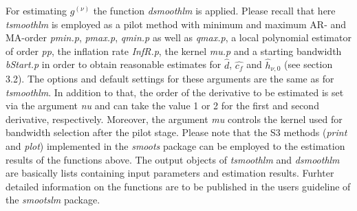 \documentclass[12pt]{article}
\begin{document}
For estimating $g^{(\nu)}$ the function \textit{dsmoothlm} is applied. Please recall that here \textit{tsmoothlm} is employed as a pilot method with minimum and maximum AR- and MA-order \textit{pmin.p}, \textit{pmax.p}, \textit{qmin.p} as well as \textit{qmax.p}, a local polynomial estimator of order \textit{pp}, the inflation rate \textit{InfR.p}, the kernel \textit{mu.p} and a starting bandwidth \textit{bStart.p} in order to obtain reasonable estimates for $\hat{d}$, $\hat{c_f}$ and $\hat{h}_{\nu,0}$ (see section 3.2). The options and default settings for these arguments are the same as for \textit{tsmoothlm}. In addition to that, the order of the derivative to be estimated is set via the argument \textit{nu} and can take the value 1 or 2 for the first and second derivative, respectively. Moreover, the argument \textit{mu} controls the kernel used for bandwidth selection after the pilot stage. Please note that the S3 methods (\textit{print} and \textit{plot}) implemented in the \textit{smoots} package can be employed to the estimation results of the functions above. The output objects of \textit{tsmoothlm} and \textit{dsmoothlm} are basically lists containing input parameters and estimation results. Furhter detailed information on the functions are to be published in the users guideline of the \textit{smootslm} package.       
\end{document}
